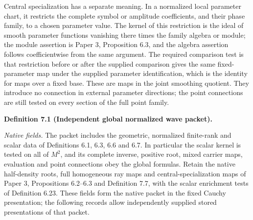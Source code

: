\documentclass[
  english,
  11pt,
  reqno]{amsart}
\makeatletter
\newcommand{\pandocstatementheading}[1]{%
  \par\addpenalty{\@beginparpenalty}%
  \addvspace{.5\baselineskip plus .2\baselineskip minus .2\baselineskip}%
  {\normalfont\bfseries #1\par}%
  \nobreak\@afterindenttrue\@afterheading
}
\makeatother
\begin{document}
Central specialization has a separate meaning. In a normalized local
parameter chart, it restricts the complete symbol or amplitude
coefficients, and their phase family, to a chosen parameter value. The
kernel of this restriction is the ideal of smooth parameter functions
vanishing there times the family algebra or module; the module assertion
is Paper 3, Proposition 6.3, and the algebra assertion follows
coefficientwise from the same argument. The required comparison test is
that restriction before or after the supplied comparison gives the same
fixed-parameter map under the supplied parameter identification, which
is the identity for maps over a fixed base. These are maps in the joint
smoothing quotient. They introduce no connection in external parameter
directions; the point connections are still tested on every section of
the full point family.

\pandocstatementheading{\protect{}\label{def:global-independent-normalized-wave-packet}Definition 7.1 (Independent global normalized wave packet).}

\emph{Native fields.} The packet includes the geometric, normalized
finite-rank and scalar data of Definitions 6.1, 6.3, 6.6 and 6.7. In
particular the scalar kernel is tested on all of \(M^2\), and its
complete inverse, positive root, mixed carrier maps, evaluation and
point connections obey the global formulas. Retain the native
half-density roots, full homogeneous ray maps and central-specialization
maps of Paper 3, Propositions 6.2--6.3 and Definition 7.7, with the
scalar enrichment tests of Definition 6.23. These fields form the native
packet in the fixed Cauchy presentation; the following records allow
independently supplied stored presentations of that packet.
\end{document}
